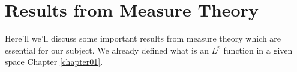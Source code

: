 \chapter{Results from Measure Theory}
Here'll we'll discuss some important results from measure theory which are essential for our subject. We already defined what is an $L^p$ function in a given space Chapter \ref{chapter01}.

